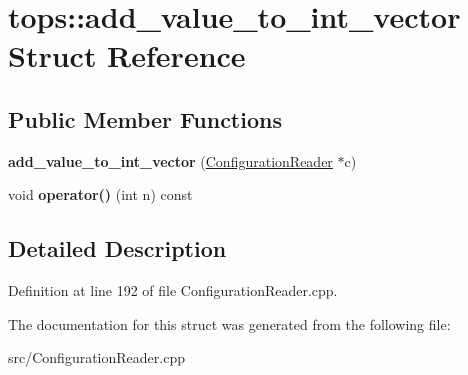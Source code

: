 \hypertarget{structtops_1_1add__value__to__int__vector}{}\section{tops\+:\+:add\+\_\+value\+\_\+to\+\_\+int\+\_\+vector Struct Reference}
\label{structtops_1_1add__value__to__int__vector}
\subsection*{Public Member Functions}
\begin{DoxyCompactItemize}
\item 
\mbox{\label{structtops_1_1add__value__to__int__vector_aaa676a73a6b1d2741de00de823c31a8e}} 
{\bfseries add\+\_\+value\+\_\+to\+\_\+int\+\_\+vector} (\hyperlink{classtops_1_1ConfigurationReader}{Configuration\+Reader} $\ast$c)
\item 
\mbox{\label{structtops_1_1add__value__to__int__vector_a82bc4eef33a336b5780721a7356be53c}} 
void {\bfseries operator()} (int n) const
\end{DoxyCompactItemize}


\subsection{Detailed Description}


Definition at line 192 of file Configuration\+Reader.\+cpp.



The documentation for this struct was generated from the following file\+:\begin{DoxyCompactItemize}
\item 
src/Configuration\+Reader.\+cpp\end{DoxyCompactItemize}
